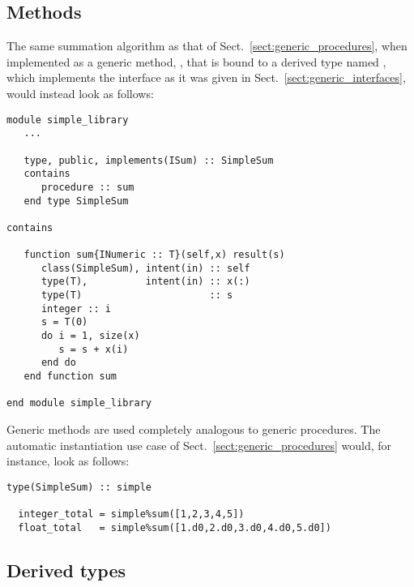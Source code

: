 \documentclass[11pt,oneside]{report}
\newcommand{\code}[1]{{\selectfont\ttfamily{#1}}}
\begin{document}
\subsection{Methods}
\label{sect:generic_methods}

The same summation algorithm as that of
Sect.~\ref{sect:generic_procedures}, when implemented as a generic
method, \code{sum}, that is bound to a derived type named
\code{SimpleSum}, which implements the interface \code{ISum} as it was
given in Sect.~\ref{sect:generic_interfaces}, would instead look as
follows:
\begin{lstlisting}[language=LFortran,style=boxed]
module simple_library
   ...

   type, public, implements(ISum) :: SimpleSum
   contains
      procedure :: sum
   end type SimpleSum

contains
   
   function sum{INumeric :: T}(self,x) result(s)
      class(SimpleSum), intent(in) :: self
      type(T),          intent(in) :: x(:)
      type(T)                      :: s
      integer :: i
      s = T(0)
      do i = 1, size(x)
         s = s + x(i)
      end do
   end function sum

end module simple_library
\end{lstlisting}

Generic methods are used completely analogous to generic
procedures. The automatic instantiation use case of
Sect.~\ref{sect:generic_procedures} would, for instance, look as
follows:
\begin{lstlisting}[language=LFortran,style=boxed]
  type(SimpleSum) :: simple

  integer_total = simple%sum([1,2,3,4,5])
  float_total   = simple%sum([1.d0,2.d0,3.d0,4.d0,5.d0])
\end{lstlisting}

\subsection{Derived types}
\label{sect:generic_derived_types}
\end{document}
